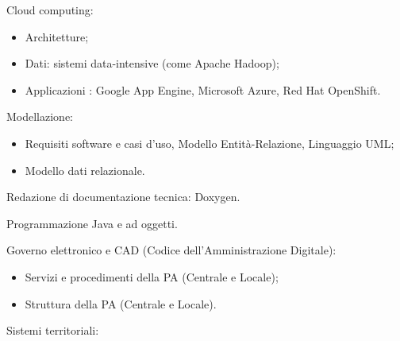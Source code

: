 \documentclass[totpages,helvetica,openbib,italian]{europecv}
\begin{document}
\begin{europecv}
{\begin{minipage}[t]{1\linewidth}
Cloud computing:
\begin{itemize}
   \vspace{-3mm}\item[]Architetture;
   \vspace{-3mm}\item[]Dati: sistemi data-intensive (come Apache Hadoop);
   \vspace{-3mm}\item[]Applicazioni : Google App Engine, Microsoft Azure, Red Hat OpenShift.
   \end{itemize}

Modellazione:
\begin{itemize}

 \vspace{-3mm}\item[]   Requisiti software e casi d’uso, Modello Entità-Relazione, Linguaggio UML;
\vspace{-3mm}\item[]    Modello dati relazionale.
    \end{itemize}
Redazione di documentazione tecnica: Doxygen.\\
\vspace{1mm}

Programmazione Java e ad oggetti.\\
\vspace{1mm}

Governo elettronico e CAD (Codice dell’Amministrazione Digitale):
\begin{itemize}

\vspace{-3mm}\item[] Servizi e procedimenti della PA (Centrale e Locale);
\vspace{-3mm}\item[]    Struttura della PA (Centrale e Locale).
\end{itemize}
  Sistemi territoriali:
  \begin{itemize}


\end{itemize}
\end{minipage}}
\end{europecv}
\end{document}
